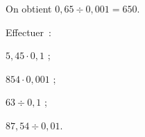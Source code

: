 \begin{methode*1}
\begin{exemple*1}
\begin{minipage}{.55\linewidth}
On obtient $0,65 \div 0,001 = 650$.
\end{minipage}
\end{exemple*1}


\exercice

Effectuer :
\begin{colenumerate}{4}
 \item $5,45 \cdot 0,1$ ;
 \item $854 \cdot 0,001$ ;
 \item $63 \div 0,1$ ;
 \item $87,54 \div 0,01$.
 \end{colenumerate}

\end{methode*1}


